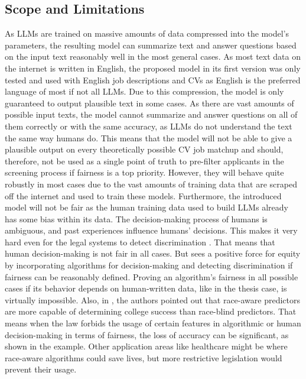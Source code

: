 \documentclass[draft,final]{thesisclass} %
\begin{document}
\subsection{Scope and Limitations}
As \acs{LLM}s are trained on massive amounts of data compressed into the model's parameters, the resulting model can summarize text and answer questions based on the input text reasonably well in the most general cases.
As most text data on the internet is written in English, the proposed model in its first version was only tested and used with English job descriptions and \acs{CV}s as English is the preferred language of most if not all \acs{LLM}s.
Due to this compression, the model is only guaranteed to output plausible text in some cases. 
As there are vast amounts of possible input texts, the model cannot summarize and answer questions on all of them correctly or with the same accuracy, as \acs{LLM}s do not understand the text the same way humans do.
This means that the model will not be able to give a plausible output on every theoretically possible \acs{CV} job matchup and should, therefore, not be used as a single point of truth to pre-filter applicants in the screening process if fairness is a top priority.
However, they will behave quite robustly in most cases due to the vast amounts of training data that are scraped off the internet and used to train these models.
Furthermore, the introduced model will not be fair as the human training data used to build \acs{LLM}s already has some bias within its data. The decision-making process of humans is ambiguous, and past experiences influence humans’ decisions. This makes it very hard even for the legal systems to detect discrimination \parencite[113]{discrimination_algorithms}. That means that human decision-making is not fair in all cases. But \textcite[113]{discrimination_algorithms} sees a positive force for equity by incorporating algorithms for decision-making and detecting discrimination if fairness can be reasonably defined. Proving an algorithm's fairness in all possible cases if its behavior depends on human-written data, like in the thesis case, is virtually impossible. Also, in \textcite[158-160]{discrimination_algorithms}, the authors pointed out that race-aware predictors are more capable of determining college success than race-blind predictors.
That means when the law forbids the usage of certain features in algorithmic or human decision-making in terms of fairness, the loss of accuracy can be significant, as shown in the example. Other application areas like healthcare might be where race-aware algorithms could save lives, but more restrictive legislation would prevent their usage.
\end{document}
